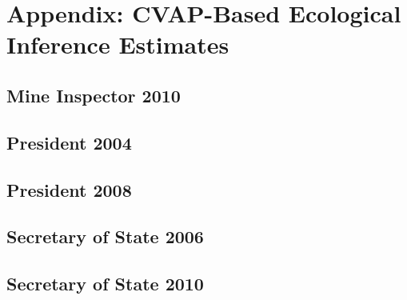 \documentclass[12pt]{article}
\begin{document}
\clearpage
\appendix

\section{Appendix: CVAP-Based Ecological Inference Estimates}

\subsection{Mine Inspector 2010}



\clearpage



\clearpage

\subsection{President 2004}



\clearpage




\clearpage

\subsection{President 2008}



\clearpage



\clearpage

\subsection{Secretary of State 2006}




\clearpage



\clearpage

\subsection{Secretary of State 2010}




\clearpage




\clearpage
\singlespace
 
\bibsep=0in 
{}

\end{document}
